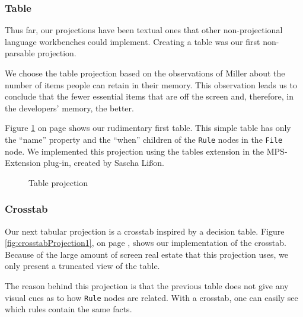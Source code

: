 \subsubsection{Table}
Thus far, our projections have been textual ones that other non-projectional language workbenches could implement.
Creating a table was our first non-parsable projection.

We choose the table projection based on the observations of Miller\cite{miller1956magical} about the number of items people can retain in their memory.
This observation leads us to conclude that the fewer essential items that are off the screen and, therefore, in the developers' memory, the better.

Figure \ref{fig:tableProjection1} on page \pageref{fig:tableProjection1} shows our rudimentary first table.
This simple table has only the ``name'' property and the ``when'' children of the \texttt{Rule} nodes in the \texttt{File} node.
We implemented this projection using the tables extension in the MPS-Extension plug-in, created by Sascha Lißon.

\begin{figure}
    \centering
    \caption{Table projection}
    \label{fig:tableProjection1}
\end{figure}

\subsubsection{Crosstab}
Our next tabular projection is a crosstab inspired by a decision table.
Figure \ref{fig:crosstabProjection1}, on page \pageref{fig:crosstabProjection1}, shows our implementation of the crosstab.
Because of the large amount of screen real estate that this projection uses, we only present a truncated view of the table.

The reason behind this projection is that the previous table does not give any visual cues as to how \texttt{Rule} nodes are related.
With a crosstab, one can easily see which rules contain the same facts.

